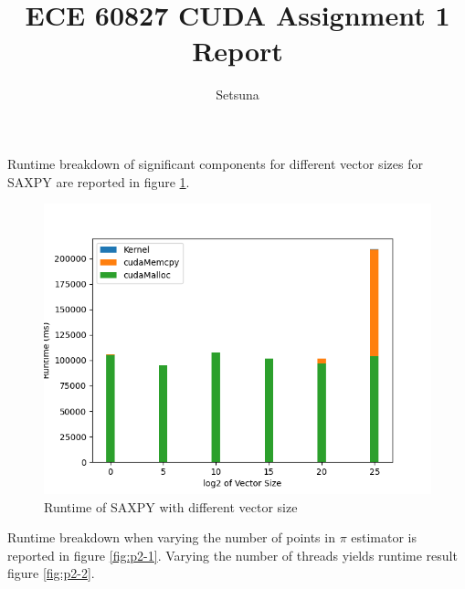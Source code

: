 \documentclass{article}
\author{Setsuna}
\title{ECE 60827 CUDA Assignment 1 Report}
\begin{document}
\maketitle
Runtime breakdown of significant components for different vector sizes for SAXPY are reported in figure \ref{fig:p1}.

\begin{figure}[h!]
	\centering
	\includegraphics[width=\linewidth]{p1.png}
	\caption{Runtime of SAXPY with different vector size}
	\label{fig:p1}
\end{figure}

Runtime breakdown when varying the number of points in $\pi$ estimator is reported in figure \ref{fig:p2-1}. Varying the number of threads yields runtime result figure \ref{fig:p2-2}.
\end{document}

